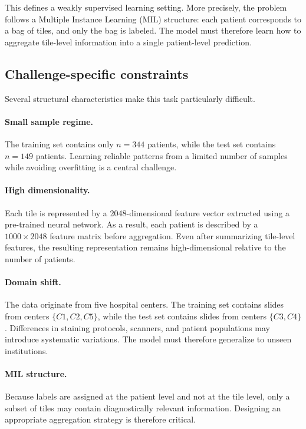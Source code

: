 \documentclass[11pt,a4paper]{article}
\begin{document}
This defines a weakly supervised learning setting. 
More precisely, the problem follows a Multiple Instance Learning (MIL) structure: each patient corresponds to a bag of tiles, and only the bag is labeled. 
The model must therefore learn how to aggregate tile-level information into a single patient-level prediction.

\subsection{Challenge-specific constraints}

Several structural characteristics make this task particularly difficult.

\paragraph{Small sample regime.}
The training set contains only $n = 344$ patients, while the test set contains $n = 149$ patients. 
Learning reliable patterns from a limited number of samples while avoiding overfitting is a central challenge.

\paragraph{High dimensionality.}
Each tile is represented by a 2048-dimensional feature vector extracted using a pre-trained neural network. 
As a result, each patient is described by a $1000 \times 2048$ feature matrix before aggregation. 
Even after summarizing tile-level features, the resulting representation remains high-dimensional relative to the number of patients.

\paragraph{Domain shift.}
The data originate from five hospital centers. 
The training set contains slides from centers $\{C1, C2, C5\}$, while the test set contains slides from centers $\{C3, C4\}$. 
Differences in staining protocols, scanners, and patient populations may introduce systematic variations. 
The model must therefore generalize to unseen institutions.

\paragraph{MIL structure.}
Because labels are assigned at the patient level and not at the tile level, only a subset of tiles may contain diagnostically relevant information. 
Designing an appropriate aggregation strategy is therefore critical.
\end{document}
